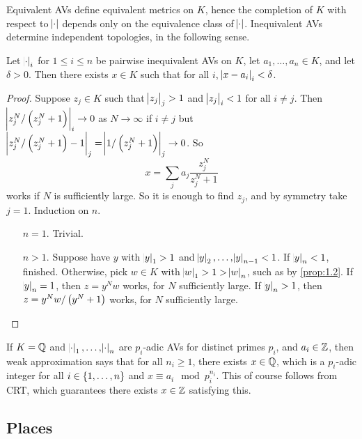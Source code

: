\pagebreak

Equivalent AVs define equivalent metrics on $ K $, hence the completion of $ K $ with respect to $ \abs{\cdot} $ depends only on the equivalence class of $ \abs{\cdot} $. Inequivalent AVs determine independent topologies, in the following sense.

\begin{proposition}
Let $ \abs{\cdot}_i $ for $ 1 \le i \le n $ be pairwise inequivalent AVs on $ K $, let $ a_1, \dots, a_n \in K $, and let $ \delta > 0 $. Then there exists $ x \in K $ such that for all $ i $, $ \abs{x - a_i}_i < \delta $.
\end{proposition}

\begin{proof}
Suppose $ z_j \in K $ such that $ \abs{z_j}_j > 1 $ and $ \abs{z_j}_i < 1 $ for all $ i \ne j $. Then $ \abs{z_j^N / \br{z_j^N + 1}}_i \to 0 $ as $ N \to \infty $ if $ i \ne j $ but $ \abs{z_j^N / \br{z_j^N + 1} - 1}_j = \abs{1 / \br{z_j^N + 1}}_j \to 0 $. So
$$ x = \sum_j a_j\dfrac{z_j^N}{z_j^N + 1} $$
works if $ N $ is sufficiently large. So it is enough to find $ z_j $, and by symmetry take $ j = 1 $. Induction on $ n $.
\begin{itemize}[leftmargin=0.5in]
\item[$ n = 1 $.] Trivial.
\item[$ n > 1 $.] Suppose have $ y $ with $ \abs{y}_1 > 1 $ and $ \abs{y}_2, \dots, \abs{y}_{n - 1} < 1 $. If $ \abs{y}_n < 1 $, finished. Otherwise, pick $ w \in K $ with $ \abs{w}_1 > 1 > \abs{w}_n $, such as by \ref{prop:1.2}. If $ \abs{y}_n = 1 $, then $ z = y^Nw $ works, for $ N $ sufficiently large. If $ \abs{y}_n > 1 $, then $ z = y^Nw / \br{y^N + 1} $ works, for $ N $ sufficiently large.
\end{itemize}
\end{proof}

\begin{remark*}
If $ K = \mathbb{Q} $ and $ \abs{\cdot}_1, \dots, \abs{\cdot}_n $ are $ p_i $-adic AVs for distinct primes $ p_i $, and $ a_i \in \mathbb{Z} $, then weak approximation says that for all $ n_i \ge 1 $, there exists $ x \in \mathbb{Q} $, which is a $ p_i $-adic integer for all $ i \in \cbr{1, \dots, n} $ and $ x \equiv a_i \mod p_i^{n_i} $. This of course follows from CRT, which guarantees there exists $ x \in \mathbb{Z} $ satisfying this.
\end{remark*}

\subsection{Places}

